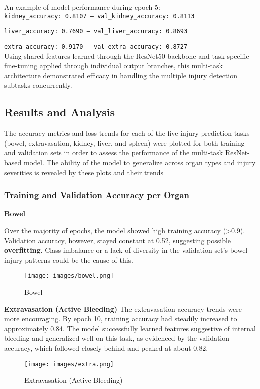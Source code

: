 \documentclass[a4paper,12pt]{article}
\begin{document}
An example of model performance during epoch 5:
\\

\verb|kidney_accuracy: 0.8107 — val_kidney_accuracy: 0.8113  |

\verb|liver_accuracy: 0.7690 — val_liver_accuracy: 0.8693  |

\verb|extra_accuracy: 0.9170 — val_extra_accuracy: 0.8727| \\

Using shared features learned through the ResNet50 backbone and task-specific fine-tuning applied through individual output branches, this multi-task architecture demonstrated efficacy in handling the multiple injury detection subtasks concurrently.


\subsection{Results and Analysis}
The accuracy metrics and loss trends for each of the five injury prediction tasks (bowel, extravasation, kidney, liver, and spleen) were plotted for both training and validation sets in order to assess the performance of the multi-task ResNet-based model. The ability of the model to generalize across organ types and injury severities is revealed by these plots and their trends

\subsubsection{Training and Validation Accuracy per Organ}

\textbf{Bowel}

Over the majority of epochs, the model showed high training accuracy (>0.9). Validation accuracy, however, stayed constant at 0.52, suggesting possible \textbf{overfitting}. Class imbalance or a lack of diversity in the validation set's bowel injury patterns could be the cause of this.


\begin{figure}[!htbp]
    \centering
    \texttt{[image: images/bowel.png]}
    \caption{Bowel}
    \label{fig:dv_meth}
\end{figure}


\textbf{Extravasation (Active Bleeding)}
The extravasation accuracy trends were more encouraging. By epoch 10, training accuracy had steadily increased to approximately 0.84. The model successfully learned features suggestive of internal bleeding and generalized well on this task, as evidenced by the validation accuracy, which followed closely behind and peaked at about 0.82.
\begin{figure}[!htbp]
    \centering
    \texttt{[image: images/extra.png]}
    \caption{Extravasation (Active Bleeding)}
    \label{fig:dv_meth}
\end{figure}
\\
\end{document}
